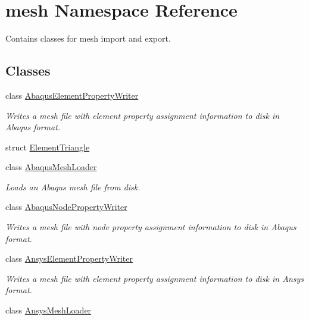 \hypertarget{namespacemesh}{
\section{mesh Namespace Reference}
\label{namespacemesh}
}


Contains classes for mesh import and export.  


\subsection*{Classes}
\begin{DoxyCompactItemize}
\item 
class \hyperlink{classmesh_1_1_abaqus_element_property_writer}{AbaqusElementPropertyWriter}
\begin{DoxyCompactList}\small\item\em Writes a mesh file with element property assignment information to disk in Abaqus format. \item\end{DoxyCompactList}\item 
struct \hyperlink{structmesh_1_1_element_triangle}{ElementTriangle}
\item 
class \hyperlink{classmesh_1_1_abaqus_mesh_loader}{AbaqusMeshLoader}
\begin{DoxyCompactList}\small\item\em Loads an Abaqus mesh file from disk. \item\end{DoxyCompactList}\item 
class \hyperlink{classmesh_1_1_abaqus_node_property_writer}{AbaqusNodePropertyWriter}
\begin{DoxyCompactList}\small\item\em Writes a mesh file with node property assignment information to disk in Abaqus format. \item\end{DoxyCompactList}\item 
class \hyperlink{classmesh_1_1_ansys_element_property_writer}{AnsysElementPropertyWriter}
\begin{DoxyCompactList}\small\item\em Writes a mesh file with element property assignment information to disk in Ansys format. \item\end{DoxyCompactList}\item 
class \hyperlink{classmesh_1_1_ansys_mesh_loader}{AnsysMeshLoader}

\end{DoxyCompactItemize}
